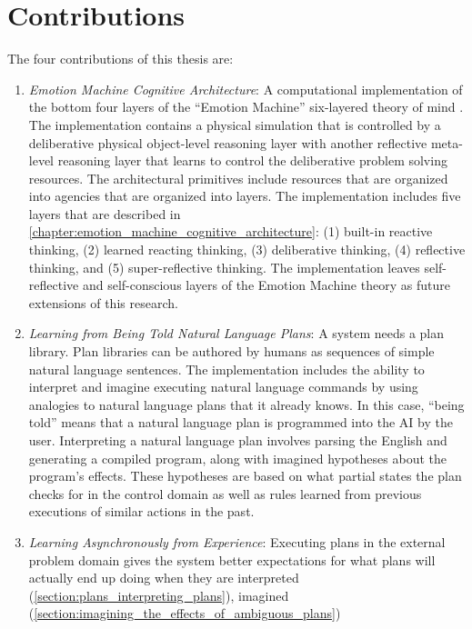 \section{Contributions}

The four contributions of this thesis are:
\begin{enumerate}
\item \emph{Emotion Machine Cognitive Architecture}: A computational
  implementation of the bottom four layers of the ``Emotion Machine''
  six-layered theory of mind \cite[]{minsky:2006}.  The implementation
  contains a physical simulation that is controlled by a deliberative
  physical object-level reasoning layer with another reflective
  meta-level reasoning layer that learns to control the deliberative
  problem solving resources.  The architectural primitives include
  resources that are organized into agencies that are organized into
  layers.  The implementation includes five layers that are described
  in
  {\mbox{\autoref{chapter:emotion_machine_cognitive_architecture}}}:
  (1) built-in reactive thinking, (2) learned reacting thinking, (3)
  deliberative thinking, (4) reflective thinking, and (5)
  super-reflective thinking.  The implementation leaves
  self-reflective and self-conscious layers of the Emotion Machine
  theory as future extensions of this research.
\item \emph{Learning from Being Told Natural Language Plans}: A system
  needs a plan library.  Plan libraries can be authored by humans as
  sequences of simple natural language sentences.  The implementation
  includes the ability to interpret and imagine executing natural
  language commands by using analogies to natural language plans that
  it already knows.  In this case, ``being told'' means that a natural
  language plan is programmed into the AI by the user.  Interpreting a
  natural language plan involves parsing the English and generating a
  compiled program, along with imagined hypotheses about the program's
  effects.  These hypotheses are based on what partial states the plan
  checks for in the control domain as well as rules learned from
  previous executions of similar actions in the past.
\item \emph{Learning Asynchronously from Experience}: Executing plans
  in the external problem domain gives the system better expectations
  for what plans will actually end up doing when they are interpreted
  ({\mbox{\autoref{section:plans_interpreting_plans}}}), imagined
  ({\mbox{\autoref{section:imagining_the_effects_of_ambiguous_plans}}})

\end{enumerate}
